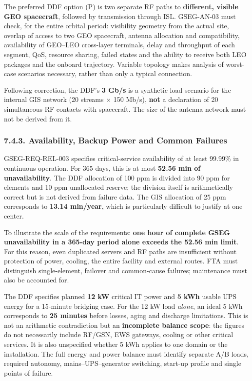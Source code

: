 The preferred DDF option (P) is two separate RF paths to \textbf{different, visible GEO spacecraft}, followed by transmission through ISL. GSEG-AN-03 must check, for the entire orbital period: visibility geometry from the actual site, overlap of access to two GEO spacecraft, antenna allocation and compatibility, availability of GEO–LEO cross-layer terminals, delay and throughput of each segment, QoS, resource sharing, failed states and the ability to receive both LEO packages and the onboard trajectory. Variable topology makes analysis of worst-case scenarios necessary, rather than only a typical connection.

Following correction, the DDF's \textbf{3 Gb/\allowbreak{}s} is a synthetic load scenario for the internal GIS network (20 streams × 150 Mb/\allowbreak{}s), \textbf{not} a declaration of 20 simultaneous RF contacts with spacecraft. The size of the antenna network must not be derived from it.

\subsubsection{7.4.3. Availability, Backup Power and Common Failures}\label{ddjf-7-4-3}

GSEG-REQ-REL-003 specifies critical-service availability of at least 99.99\% in continuous operation. For 365 days, this is at most \textbf{52.56 min of unavailability}. The DDF allocation of 100 ppm is divided into 90 ppm for elements and 10 ppm unallocated reserve; the division itself is arithmetically correct but is not derived from failure data. The GIS allocation of 25 ppm corresponds to \textbf{13.14 min/\allowbreak{}year}, which is particularly difficult to justify at one center.

To illustrate the scale of the requirements: \textbf{one hour of complete GSEG unavailability in a 365-day period alone exceeds the 52.56 min limit}. For this reason, even duplicated servers and RF paths are insufficient without protection of power, cooling, the entire facility and external routes. FTA must distinguish single-element, failover and common-cause failures; maintenance must also be accounted for.

The DDF specifies planned \textbf{12 kW} critical IT power and \textbf{5 kWh} usable UPS energy for a 15-minute bridging case. For the 12 kW load \emph{alone}, an ideal 5 kWh corresponds to \textbf{25 minutes} before losses, aging and discharge limitations. This is not an arithmetic contradiction but an \textbf{incomplete balance scope}: the figures do not necessarily include RF/\allowbreak{}GSN, EWS gateways, cooling or other critical services. It is also unspecified whether 5 kWh applies to one domain or the installation. The full energy and power balance must identify separate A/\allowbreak{}B loads, required autonomy, mains–UPS–generator switching, start-up profile and single points of failure.

